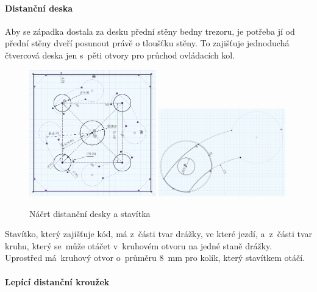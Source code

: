 \newpage

\paragraph{Distanční deska}

Aby se západka dostala za desku přední stěny bedny trezoru, je potřeba jí od přední stěny dveří posunout právě o tloušťku stěny. To zajišťuje jednoduchá čtvercová deska jen s~pěti otvory
pro průchod ovládacích kol.

\begin{figure}[h]
	\centering
    \includegraphics[width=0.49\textwidth]{kapitoly/obrazky/M3/distancka.png}
    \includegraphics[width=0.49\textwidth]{kapitoly/obrazky/M3/kamen.png}
    \caption{Náčrt distanční desky a stavítka}
    \label{fig:M3-kamen}
    \label{fig:M3-distancka}
\end{figure}

Stavítko, který zajišťuje kód, má z~části tvar drážky, ve které jezdí, a~z~části tvar kruhu, který se~může otáčet v~kruhovém otvoru na jedné staně drážky.
Uprostřed má~kruhový otvor o~průměru 8~mm pro kolík, který stavítkem otáčí.

\paragraph{Lepící distanční kroužek}

